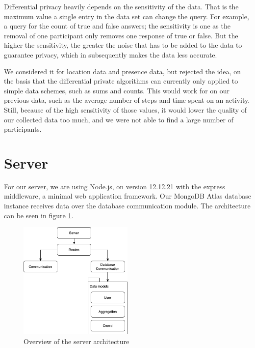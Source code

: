 Differential privacy heavily depends on the sensitivity of the data. That is the maximum value a single entry in the data set can change the query. For example, a query for the count of true and false answers; the sensitivity is one as the removal of one participant only removes one response of true or false. But the higher the sensitivity, the greater the noise that has to be added to the data to guarantee privacy, which in subsequently makes the data less accurate.

We considered it for location data and presence data, but rejected the idea, on the basis that the differential private algorithms can currently only applied to simple data schemes, such as sums and counts. This would work for on our previous data, such as the average number of steps and time spent on an activity. Still, because of the high sensitivity of those values, it would lower the quality of our collected data too much, and we were not able to find a large number of participants.

\section{Server}
For our server, we are using Node.js,
on version 12.12.21 with the express middleware, a minimal web application framework.
Our MongoDB Atlas database instance
receives data over the database communication module. The architecture can be seen in figure \ref{fig:server}.

\begin{figure}[htpb]
  \centering
  \includegraphics[width=0.5\textwidth]{figures/server}
  \caption{Overview of the server architecture} \label{fig:server}
\end{figure}

